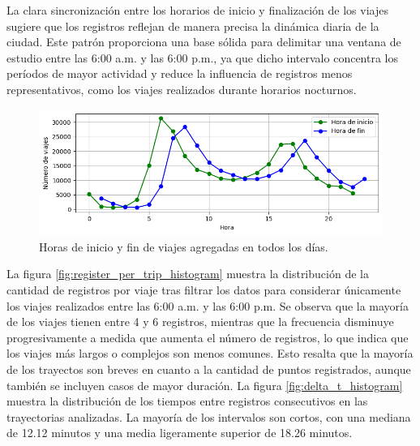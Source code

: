 La clara sincronización entre los horarios de inicio y finalización de los viajes sugiere que los registros reflejan de manera precisa la dinámica diaria de la ciudad. Este patrón proporciona una base sólida para delimitar una ventana de estudio entre las 6:00 a.m. y las 6:00 p.m., ya que dicho intervalo concentra los períodos de mayor actividad y reduce la influencia de registros menos representativos, como los viajes realizados durante horarios nocturnos.

\begin{figure}[!htb] \centering \includegraphics[width=1\textwidth]{Graphics/trips_per_timeslot_plot.png} \caption{Horas de inicio y fin de viajes agregadas en todos los días.} \label{fig:trips_per_timeslot_plot} 
\end{figure}

La figura \ref{fig:register_per_trip_histogram} muestra la distribución de la cantidad de registros por viaje tras filtrar los datos para considerar únicamente los viajes realizados entre las 6:00 a.m. y las 6:00 p.m. Se observa que la mayoría de los viajes tienen entre 4 y 6 registros, mientras que la frecuencia disminuye progresivamente a medida que aumenta el número de registros, lo que indica que los viajes más largos o complejos son menos comunes. Esto resalta que la mayoría de los trayectos son breves en cuanto a la cantidad de puntos registrados, aunque también se incluyen casos de mayor duración. La figura \ref{fig:delta_t_histogram} muestra la distribución de los tiempos entre registros consecutivos en las trayectorias analizadas. La mayoría de los intervalos son cortos, con una mediana de 12.12 minutos y una media ligeramente superior de 18.26 minutos. 

